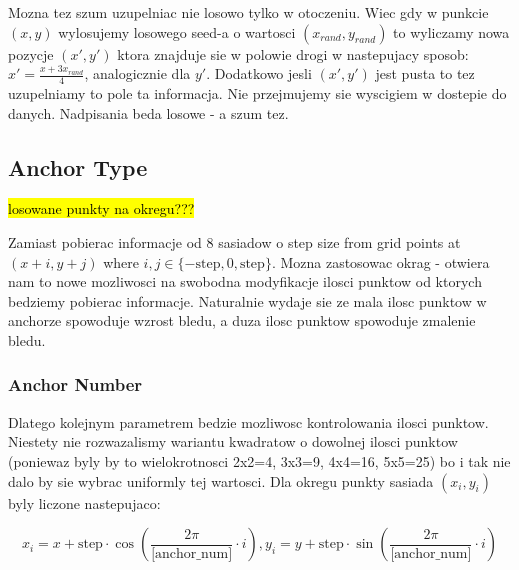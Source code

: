 \documentclass[format=acmsmall,screen,review,authordraft,nonacm]{acmart}
\begin{document}

Mozna tez szum uzupelniac nie losowo tylko w otoczeniu. Wiec gdy w punkcie
$(x,y)$ wylosujemy losowego seed-a o wartosci $(x_{rand}, y_{rand})$ to
wyliczamy nowa pozycje $(x', y')$ ktora znajduje sie
w polowie drogi w nastepujacy sposob: $x' = \frac{x+3x_{rand}}{4}$, analogicznie
dla $y'$. Dodatkowo jesli $(x', y')$ jest pusta to tez uzupelniamy to pole ta
informacja. Nie przejmujemy sie wyscigiem w dostepie do danych. Nadpisania beda
losowe - a szum tez.

\subsection{Anchor Type} %

\hl{losowane punkty na okregu???}

Zamiast pobierac informacje od 8 sasiadow o step size from grid points at
$(x+i, y+j)$ where $i, j \in \{-\text{step}, 0, \text{step}\}$. Mozna zastosowac
okrag - otwiera nam to nowe mozliwosci na swobodna modyfikacje ilosci punktow od
ktorych bedziemy pobierac informacje. Naturalnie wydaje sie ze mala ilosc
punktow w anchorze spowoduje wzrost bledu, a duza ilosc punktow spowoduje
zmalenie bledu.

\subsubsection{Anchor Number} %

Dlatego kolejnym parametrem bedzie mozliwosc kontrolowania ilosci punktow.
Niestety nie rozwazalismy wariantu kwadratow o dowolnej ilosci punktow (poniewaz
byly by to wielokrotnosci 2x2=4, 3x3=9, 4x4=16, 5x5=25) bo i tak nie dalo by sie
wybrac uniformly tej wartosci. Dla okregu punkty sasiada $(x_i, y_i)$ byly liczone
nastepujaco:
   
$$
x_i = x + \text{step} \cdot \cos( \frac{2\pi}{\text{[anchor\_num]}} \cdot i ),
y_i = y + \text{step} \cdot \sin( \frac{2\pi}{\text{[anchor\_num]}} \cdot i )
$$
\end{document}
